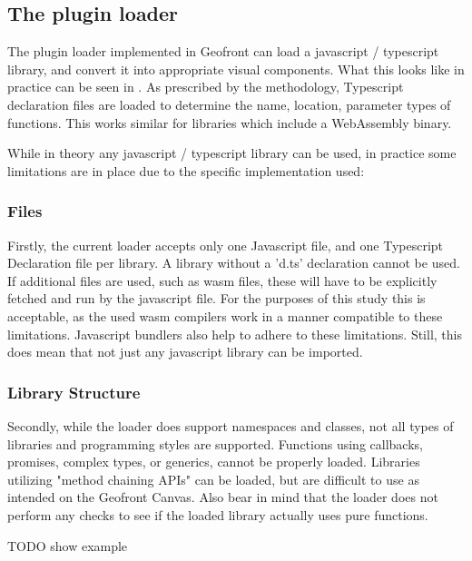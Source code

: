 \subsection{The plugin loader}
\label{sec:implementation:loading:limits}

The plugin loader implemented in Geofront can load a javascript / typescript library, and convert it into appropriate visual components. 
What this looks like in practice can be seen in .
As prescribed by the methodology, Typescript declaration files are loaded to determine the name, location, parameter types of functions. 
This works similar for libraries which include a WebAssembly binary.

While in theory any javascript / typescript library can be used, in practice some limitations are in place due to the specific implementation used:

\subsubsection*{Files}
Firstly, the current loader accepts only one Javascript file, and one Typescript Declaration file per library.
A library without a 'd.ts' declaration cannot be used. 
If additional files are used, such as \ac{wasm} files, these will have to be explicitly fetched and run by the javascript file. 
For the purposes of this study this is acceptable, as the used \ac{wasm} compilers work in a manner compatible to these limitations.
Javascript bundlers also help to adhere to these limitations.
Still, this does mean that not just any javascript library can be imported. 

\subsubsection*{Library Structure}
Secondly, while the loader does support namespaces and classes, not all types of libraries and programming styles are supported. 
Functions using callbacks, promises, complex types, or generics, cannot be properly loaded. 
Libraries utilizing "method chaining APIs" can be loaded, but are difficult to use as intended on the Geofront Canvas.
Also bear in mind that the loader does not perform any checks to see if the loaded library actually uses pure functions. 

\begin{note}
  TODO show example
\end{note}

